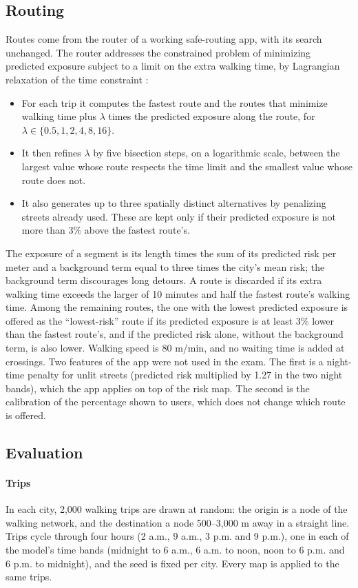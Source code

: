 \documentclass[preprint,12pt,authoryear]{elsarticle}
\begin{document}
\subsection{Routing}\label{sec:routing}
Routes come from the router of a working safe-routing app, with its search unchanged. The router addresses the constrained problem of minimizing predicted exposure subject to a limit on the extra walking time, by Lagrangian relaxation of the time constraint \citep{handler1980dual}:
\begin{itemize}
  \item For each trip it computes the fastest route and the routes that minimize walking time plus $\lambda$ times the predicted exposure along the route, for $\lambda \in \{0.5, 1, 2, 4, 8, 16\}$.
  \item It then refines $\lambda$ by five bisection steps, on a logarithmic scale, between the largest value whose route respects the time limit and the smallest value whose route does not.
  \item It also generates up to three spatially distinct alternatives by penalizing streets already used. These are kept only if their predicted exposure is not more than 3\% above the fastest route's.
\end{itemize}
The exposure of a segment is its length times the sum of its predicted risk per meter and a background term equal to three times the city's mean risk; the background term discourages long detours. A route is discarded if its extra walking time exceeds the larger of 10 minutes and half the fastest route's walking time. Among the remaining routes, the one with the lowest predicted exposure is offered as the ``lowest-risk'' route if its predicted exposure is at least 3\% lower than the fastest route's, and if the predicted risk alone, without the background term, is also lower. Walking speed is 80 m/min, and no waiting time is added at crossings. Two features of the app were not used in the exam. The first is a night-time penalty for unlit streets (predicted risk multiplied by 1.27 in the two night bands), which the app applies on top of the risk map. The second is the calibration of the percentage shown to users, which does not change which route is offered.

\subsection{Evaluation}
\paragraph{Trips} In each city, 2,000 walking trips are drawn at random: the origin is a node of the walking network, and the destination a node 500--3,000 m away in a straight line. Trips cycle through four hours (2 a.m., 9 a.m., 3 p.m. and 9 p.m.), one in each of the model's time bands (midnight to 6 a.m., 6 a.m. to noon, noon to 6 p.m. and 6 p.m. to midnight), and the seed is fixed per city. Every map is applied to the same trips.
\end{document}
